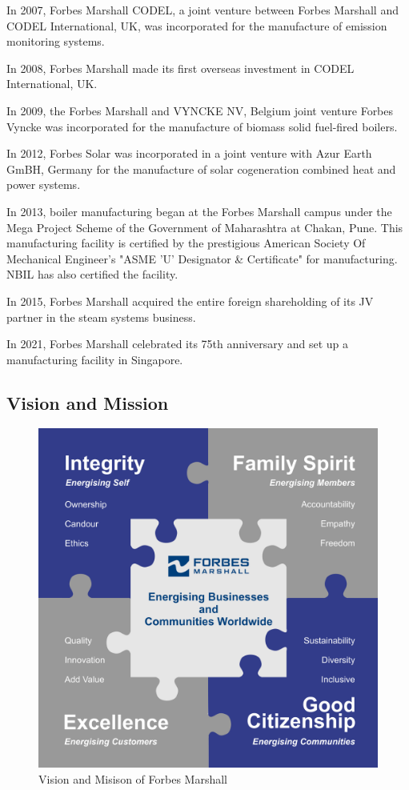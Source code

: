 In 2007, Forbes Marshall CODEL, a joint venture between Forbes Marshall and CODEL International, UK, was incorporated for the manufacture of emission monitoring systems.

In 2008, Forbes Marshall made its first overseas investment in CODEL International, UK.

In 2009, the Forbes Marshall and VYNCKE NV, Belgium joint venture Forbes Vyncke was incorporated for the manufacture of biomass solid fuel-fired boilers.

In 2012, Forbes Solar was incorporated in a joint venture with Azur Earth GmBH, Germany for the manufacture of solar cogeneration combined heat and power systems.

In 2013, boiler manufacturing began at the Forbes Marshall campus under the Mega Project Scheme of the Government of Maharashtra at Chakan, Pune. This manufacturing facility is certified by the prestigious American Society Of Mechanical Engineer's "ASME 'U' Designator \& Certificate" for manufacturing. NBIL has also certified the facility.

In 2015, Forbes Marshall acquired the entire foreign shareholding of its JV partner in the steam systems business.

In 2021, Forbes Marshall celebrated its 75th anniversary and set up a manufacturing facility in Singapore.

\subsection{Vision and Mission}
\begin{figure}[h!]
    \centering
    \includegraphics[width=0.5\linewidth]{figs/forbes_marshall_values.png}
    \caption{Vision and Misison of Forbes Marshall}
    \label{fig:forbes_marshall_values}
\end{figure}

